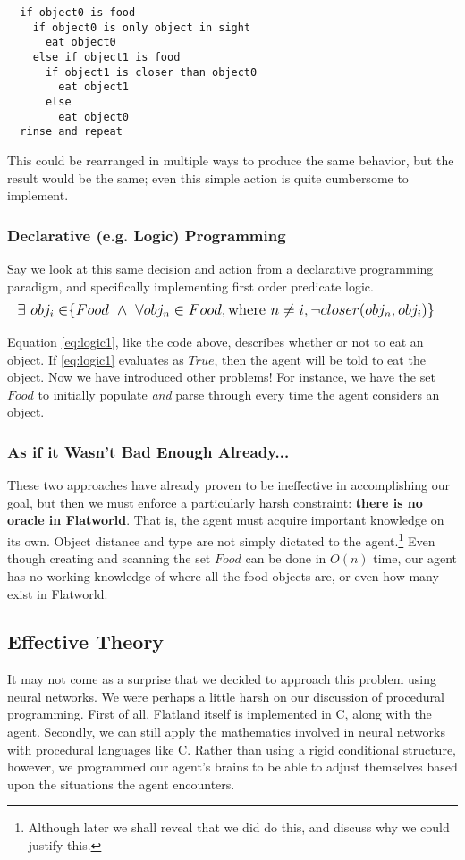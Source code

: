 \begin{verbatim}
  if object0 is food
    if object0 is only object in sight
      eat object0
    else if object1 is food
      if object1 is closer than object0
        eat object1 
      else
        eat object0
  rinse and repeat
\end{verbatim}

This could be rearranged in multiple ways to produce the same behavior,
but the result would be the same; even this simple action is quite cumbersome
to implement.

\subsubsection{Declarative (e.g. Logic) Programming}
Say we look at this same decision and action from a declarative programming
paradigm, and specifically implementing first order predicate logic.
\begin{equation} \label{eq:logic1}
  \large
  \begin{aligned}
    \exists\ obj_i \in &\{Food\ \wedge\ \forall obj_n \in Food, \text{where }
    n \neq i, \neg closer(obj_n,obj_i)\}
  \end{aligned}
\end{equation}

Equation \eqref{eq:logic1}, like the code above, describes whether or 
not to eat an object. If \eqref{eq:logic1} evaluates as $True$, then the agent 
will be told to eat the object. Now we have introduced other problems! For 
instance, we have the set $Food$ to initially populate \emph{and} parse 
through every time the agent considers an object. 

\subsubsection{As if it Wasn't Bad Enough Already...}
These two approaches have already proven to be ineffective in accomplishing
our goal, but then we must enforce a particularly harsh constraint: 
\textbf{there is no oracle in Flatworld}. That is, the agent must acquire
important knowledge on its own. Object distance and type are not simply
dictated to the agent.\footnote{Although later we shall reveal that we did
do this, and discuss why we could justify this.} Even though creating and
scanning the set $Food$ can be done in $O(n)$ time, our agent has no working
knowledge of where all the food objects are, or even how many exist
in Flatworld.


\subsection{Effective Theory}
It may not come as a surprise that we decided to approach this problem using
neural networks. We were perhaps a little harsh on our discussion of 
procedural programming. First of all, Flatland itself is implemented in C,
along with the agent. Secondly, we can still apply the mathematics involved
in neural networks with procedural languages like C. Rather than using a
rigid conditional structure, however, we programmed our agent's brains to
be able to adjust themselves based upon the situations the agent encounters.

